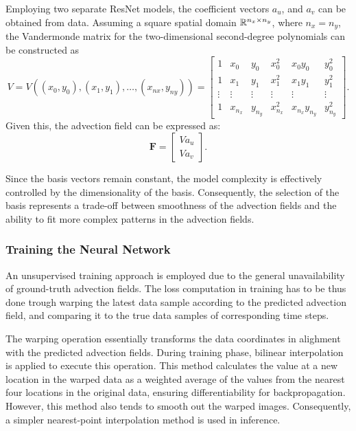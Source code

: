 Employing two separate ResNet models, the coefficient vectors $a_u$, and $a_v$ can be obtained from data.
Assuming a square spatial domain $\mathbb{R}^{n_x \times n_y}$, where $n_x = n_y$, the Vandermonde matrix for the two-dimensional second-degree polynomials can be constructed as
\begin{equation}
    V = V((x_0,y_0),(x_1,y_1),\dots,(x_{nx}, y_{ny})) =
    \begin{bmatrix}
        1 & x_0 & y_0 & x_{0}^2 & x_{0}y_{0} & y_{0}^2\\
        1 & x_1 & y_1 & x_{1}^2 & x_{1}y_{1} & y_{1}^2\\
        \vdots & \vdots & \vdots & \vdots & \vdots & \vdots \\
        1 & x_{n_x} & y_{n_y} & x_{n_x}^2 & x_{n_x}y_{n_y} & y_{n_y}^2
    \end{bmatrix}.
\end{equation}
Given this, the advection field can be expressed as:
\begin{equation}
    \mathbf{F} = 
    \begin{bmatrix}
        Va_u \\
        Va_v
    \end{bmatrix}.
\end{equation}

Since the basis vectors remain constant, the model complexity is effectively controlled by the dimensionality of the basis.
Consequently, the selection of the basis represents a trade-off between smoothness of the advection fields and the ability to fit more complex patterns in the advection fields.

\subsubsection{Training the Neural Network}
An unsupervised training approach is employed due to the general unavailability of ground-truth advection fields.
The loss computation in training has to be thus done trough warping the latest data sample according to the predicted advection field, and comparing it to the true data samples of corresponding time steps.

The warping operation essentially transforms the data coordinates in alighment with the predicted advection fields.
During training phase, bilinear interpolation is applied to execute this operation.
This method calculates the value at a new location in the warped data as a weighted average of the values from the nearest four locations in the original data, ensuring differentiability for backpropagation.
However, this method also tends to smooth out the warped images.
Consequently, a simpler nearest-point interpolation method is used in inference.

